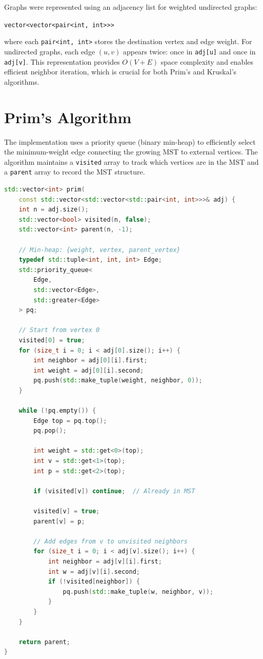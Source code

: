 \documentclass[12pt, a4paper]{report}
\begin{document}
Graphs were represented using an adjacency list for weighted undirected graphs: 

\texttt{vector<vector<pair<int, int>{>}>} 

where each \texttt{pair<int, int>} stores the destination vertex and edge weight. For undirected graphs, each edge $(u, v)$ appears twice: once in \texttt{adj[u]} and once in \texttt{adj[v]}. This representation provides $O(V + E)$ space complexity and enables efficient neighbor iteration, which is crucial for both Prim's and Kruskal's algorithms.

\section{Prim's Algorithm}

The implementation uses a priority queue (binary min-heap) to efficiently select the minimum-weight edge connecting the growing MST to external vertices. The algorithm maintains a \texttt{visited} array to track which vertices are in the MST and a \texttt{parent} array to record the MST structure.

\begin{lstlisting}[language=C++, caption={Prim's algorithm implementation}]
std::vector<int> prim(
    const std::vector<std::vector<std::pair<int, int>>>& adj) {
    int n = adj.size();
    std::vector<bool> visited(n, false);
    std::vector<int> parent(n, -1);
    
    // Min-heap: {weight, vertex, parent_vertex}
    typedef std::tuple<int, int, int> Edge;
    std::priority_queue<
        Edge, 
        std::vector<Edge>, 
        std::greater<Edge>
    > pq;
    
    // Start from vertex 0
    visited[0] = true;
    for (size_t i = 0; i < adj[0].size(); i++) {
        int neighbor = adj[0][i].first;
        int weight = adj[0][i].second;
        pq.push(std::make_tuple(weight, neighbor, 0));
    }
    
    while (!pq.empty()) {
        Edge top = pq.top();
        pq.pop();
        
        int weight = std::get<0>(top);
        int v = std::get<1>(top);
        int p = std::get<2>(top);
        
        if (visited[v]) continue;  // Already in MST
        
        visited[v] = true;
        parent[v] = p;
        
        // Add edges from v to unvisited neighbors
        for (size_t i = 0; i < adj[v].size(); i++) {
            int neighbor = adj[v][i].first;
            int w = adj[v][i].second;
            if (!visited[neighbor]) {
                pq.push(std::make_tuple(w, neighbor, v));
            }
        }
    }
    
    return parent;
}
\end{lstlisting}
\end{document}
